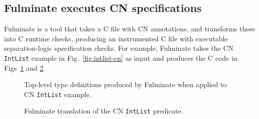 \subsection{Fulminate executes CN specifications}

Fulminate is a tool that takes a C file with CN annotations, and transforms these into C runtime checks, producing an instrumented C file with executable separation-logic specification checks. For example, Fulminate takes the CN \texttt{IntList} example in Fig.~\ref{fig:intlist-cn} as input and produces the C code in Figs~\ref{fig:intlist-fulm-datatype-defs} and \ref{fig:intlist-fulm}.

\begin{figure}[h]
  \begin{center}
    \begin{minipage}[t]{.15\textwidth}
      \lstset{
      numbers=left,
      firstnumber=1,
      numberfirstline=true
      }
      \scalebox{0.9}{}
    \end{minipage}
    \hspace*{8.5\baselineskip}
    \begin{minipage}[t]{.3\textwidth}
      \lstset{
      numbers=left,
      firstnumber=17,
      numberfirstline=true
      }
      \scalebox{0.9}{}
    \end{minipage}
  \end{center}
  \vspace{-1em}
  \caption{Top-level type definitions produced by Fulminate when applied to CN \texttt{IntList} example.}
  \label{fig:intlist-fulm-datatype-defs}
\end{figure}

\begin{figure}[h]
  \begin{center}
  \lstset{
    numbers=left,
    firstnumber=34,
    numberfirstline=true
  }
  \begin{minipage}[t]{\textwidth}
  \scalebox{0.9}{}
  \end{minipage}
  \vspace{-1em}
  \end{center}
  \caption{Fulminate translation of the CN \texttt{IntList} predicate.}
  \label{fig:intlist-fulm}
\end{figure}

